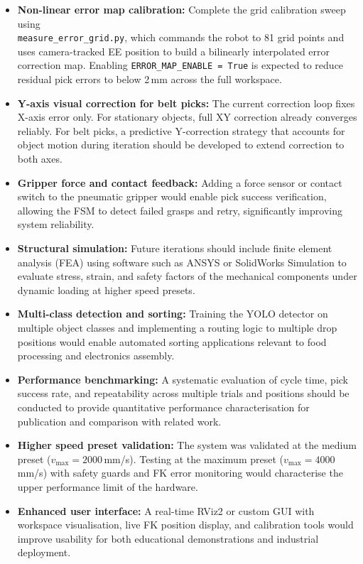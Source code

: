 \begin{itemize}
    \item \textbf{Non-linear error map calibration:} Complete the grid calibration sweep using \\ \texttt{measure\_error\_grid.py}, which commands the robot to 81 grid points and uses camera-tracked EE position to build a bilinearly interpolated error correction map. Enabling \texttt{ERROR\_MAP\_ENABLE = True} is expected to reduce residual pick errors to below 2\,mm across the full workspace.

    \item \textbf{Y-axis visual correction for belt picks:} The current correction loop fixes X-axis error only. For stationary objects, full XY correction already converges reliably. For belt picks, a predictive Y-correction strategy that accounts for object motion during iteration should be developed to extend correction to both axes.

    \item \textbf{Gripper force and contact feedback:} Adding a force sensor or contact switch to the pneumatic gripper would enable pick success verification, allowing the FSM to detect failed grasps and retry, significantly improving system reliability.

    \item \textbf{Structural simulation:} Future iterations should include finite element analysis (FEA) using software such as ANSYS or SolidWorks Simulation to evaluate stress, strain, and safety factors of the mechanical components under dynamic loading at higher speed presets.

    \item \textbf{Multi-class detection and sorting:} Training the YOLO detector on multiple object classes and implementing a routing logic to multiple drop positions would enable automated sorting applications relevant to food processing and electronics assembly.

    \item \textbf{Performance benchmarking:} A systematic evaluation of cycle time, pick success rate, and repeatability across multiple trials and positions should be conducted to provide quantitative performance characterisation for publication and comparison with related work.

    \item \textbf{Higher speed preset validation:} The system was validated at the medium preset ($v_{\max}=2000$\,mm/s). Testing at the maximum preset ($v_{\max}=4000$\,mm/s) with safety guards and FK error monitoring would characterise the upper performance limit of the hardware.

    \item \textbf{Enhanced user interface:} A real-time RViz2 or custom GUI with workspace visualisation, live FK position display, and calibration tools would improve usability for both educational demonstrations and industrial deployment.
\end{itemize}
